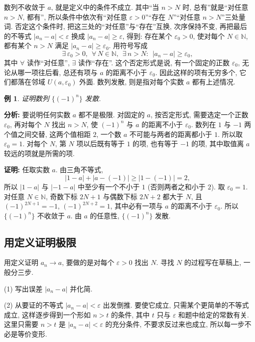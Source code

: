 \documentclass[UTF8,openany]{ctexbook}
\theoremstyle{chinesetextbook}
\newtheorem{example}{例}[section]
\newenvironment{cnproof}{\par\indent\textbf{证明:} \ignorespaces}{\par}
\begin{document}
数列不收敛于 $a$, 就是定义中的条件不成立. 其中“当 $n>N$ 时, 总有”就是“对任意 $n>N$, 都有”, 所以条件中依次有“对任意 $\varepsilon>0$”“存在 $N$”“对任意 $n>N$”三处量词. 否定这个条件时, 把这三处的“对任意”与“存在”互换, 次序保持不变, 再把最后的不等式 $|a_n-a|<\varepsilon$ 换成 $|a_n-a|\ge\varepsilon$, 得到: 存在某个 $\varepsilon_0>0$, 使对每个 $N\in\mathbb N$, 都有某个 $n>N$ 满足 $|a_n-a|\ge\varepsilon_0$. 用符号写成
\[
\exists\,\varepsilon_0>0,\ \ \forall\,N\in\mathbb N,\ \ \exists\,n>N:\ \ |a_n-a|\ge\varepsilon_0,
\]
其中 $\forall$ 读作“对任意”, $\exists$ 读作“存在”. 这个否定形式是说, 有一个固定的正数 $\varepsilon_0$, 无论从哪一项往后看, 总还有项与 $a$ 的距离不小于 $\varepsilon_0$. 因此这样的项有无穷多个, 它们都落在邻域 $U(a,\varepsilon_0)$ 外面. 数列发散, 则是指对每个实数 $a$ 都有上述情况.
\begin{example}\label{ex:12-div}
证明数列 $\{(-1)^n\}$ 发散.
\end{example}
\par\indent\textbf{分析:} 要说明任何实数 $a$ 都不是极限. 对固定的 $a$, 按否定形式, 需要选定一个正数 $\varepsilon_0$, 再对每个 $N$ 找出 $n>N$, 使 $(-1)^n$ 与 $a$ 的距离不小于 $\varepsilon_0$. 数列在 $1$ 与 $-1$ 两个值之间交替, 这两个值相距 $2$, 一个数 $a$ 不可能与两者的距离都小于 $1$. 所以取 $\varepsilon_0=1$. 对每个 $N$, 第 $N$ 项以后既有等于 $1$ 的项, 也有等于 $-1$ 的项, 其中取值离 $a$ 较远的项就是所需的项.
\begin{cnproof}
任取实数 $a$. 由三角不等式,
\[
|1-a|+|a-(-1)|\ge|1-(-1)|=2,
\]
所以 $|1-a|$ 与 $|-1-a|$ 中至少有一个不小于 $1$ (否则两者之和小于 $2$). 取 $\varepsilon_0=1$. 对任意 $N\in\mathbb N$, 奇数下标 $2N+1$ 与偶数下标 $2N+2$ 都大于 $N$, 且 $(-1)^{2N+1}=-1$, $(-1)^{2N+2}=1$, 其中必有一项与 $a$ 的距离不小于 $\varepsilon_0$. 所以 $\{(-1)^n\}$ 不收敛于 $a$. 由 $a$ 的任意性, $\{(-1)^n\}$ 发散.
\end{cnproof}
\subsection{用定义证明极限}
用定义证明 $a_n\to a$, 要做的是对每个 $\varepsilon>0$ 找出 $N$. 寻找 $N$ 的过程写在草稿上, 一般分三步.

(1) 写出误差 $|a_n-a|$ 并化简.

(2) 从要证的不等式 $|a_n-a|<\varepsilon$ 出发倒推. 要使它成立, 只需某个更简单的不等式成立, 这样逐步得到一个形如 $n>t$ 的条件, 其中 $t$ 只与 $\varepsilon$ 和题中给定的常数有关. 这里只需要 $n>t$ 是 $|a_n-a|<\varepsilon$ 的充分条件, 不要求反过来也成立, 所以每一步不必是等价变形.
\end{document}
